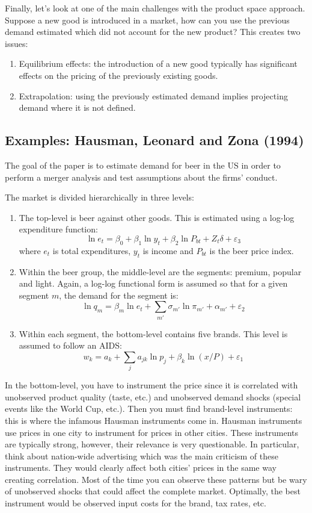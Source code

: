 \documentclass[12pt]{report}
\begin{document}
Finally, let's look at one of the main challenges with the product space approach. Suppose a new good is introduced in a market, how can you use the previous demand estimated which did not account for the new product? This creates two issues:\begin{enumerate}
\item Equilibrium effects: the introduction of a new good typically has significant effects on the pricing of the previously existing goods.
\item Extrapolation: using the previously estimated demand implies projecting demand where it is not defined.
\end{enumerate}

\subsection{Examples: Hausman, Leonard and Zona (1994)}

The goal of the paper is to estimate demand for beer in the US in order to perform a merger analysis and test assumptions about the firms' conduct.

The market is divided hierarchically in three levels:\begin{enumerate}
\item The top-level is beer against other goods. This is estimated using a log-log expenditure function: $$\ln e_t = \beta_0 + \beta_1 \ln y_t + \beta_2 \ln P_{bt} + Z_t\delta + \varepsilon_3 $$ where $e_t$ is total expenditures, $y_t$ is income and $P_{bt}$ is the beer price index.
\item Within the beer group, the middle-level are the segments: premium, popular and light. Again, a log-log functional form is assumed so that for a given segment $m$, the demand for the segment is: $$\ln q_m = \beta_m \ln e_t + \sum_{m'} \sigma_{m'} \ln \pi_{m'} + \alpha_{m'} + \varepsilon_2 $$
\item Within each segment, the bottom-level contains five brands. This level is assumed to follow an AIDS: $$w_k = a_k + \sum_{j} a_{jk} \ln p_j + \beta_k \ln (x/P) + \varepsilon_1 $$
\end{enumerate}

In the bottom-level, you have to instrument the price since it is correlated with unobserved product quality (taste, etc.) and unobserved demand shocks (special events like the World Cup, etc.). Then you must find brand-level instruments: this is where the infamous Hausman instruments come in. Hausman instruments use prices in one city to instrument for prices in other cities. These instruments are typically strong, however, their relevance is very questionable. In particular, think about nation-wide advertising which was the main criticism of these instruments. They would clearly affect both cities' prices in the same way creating correlation. Most of the time you can observe these patterns but be wary of unobserved shocks that could affect the complete market. Optimally, the best instrument would be observed input costs for the brand, tax rates, etc.
\end{document}
